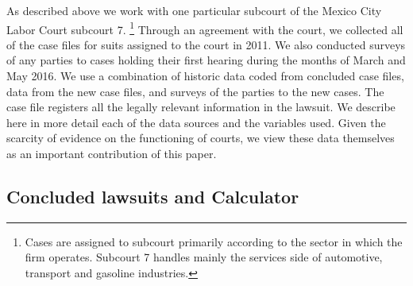 \documentclass[11pt]{article}
\begin{document}
As described above we work with one particular subcourt of the Mexico City Labor Court subcourt 7. \footnote{Cases are assigned to subcourt primarily according to the sector in which the firm operates. Subcourt 7 handles mainly the services side of automotive, transport and gasoline industries.} Through an agreement with the court, we collected all of the case files for suits assigned to the court in 2011. We also conducted surveys of any parties to cases holding their first hearing during the months of March and May 2016. We use a combination of historic data coded from concluded case files, data from the new case files, and surveys of the parties to the new cases. The case file registers all the legally relevant information in the lawsuit. We describe here in more detail each of the data sources and the variables used. Given the scarcity of evidence on the functioning of courts, we view these data themselves  as an important contribution of this paper.

\subsection{Concluded lawsuits and Calculator}
\end{document}
